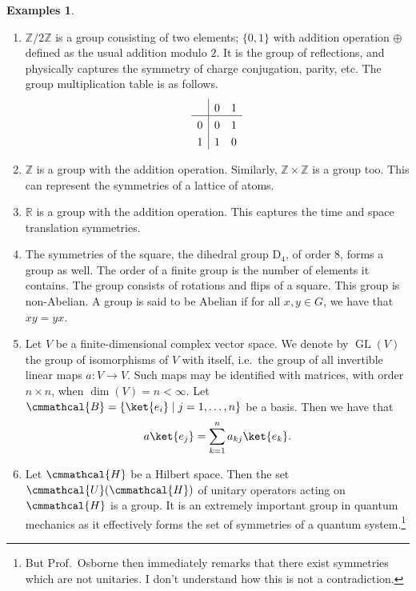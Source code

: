 \documentclass[a4 paper, 12pt]{book}
\renewcommand{\mathcal}{\cmmathcal}
\theoremstyle{definition}
\newtheorem{examples}[theorem]{Examples}
\newcommand{\rr}{\mathbb{R}}
\newcommand{\zz}{\mathbb{Z}}
\DeclareMathOperator{\GL}{GL}
\newcommand{\basis}{\mathcal{B}}
\newcommand{\hilbert}{\mathcal{H}}
\newcommand{\unitary}{\mathcal{U}}
\begin{document}
	\begin{examples}
		\leavevmode \vspace{-\baselineskip}\vspace{12pt}
		\begin{enumerate}[label={(\alph*)},ref={\alph*}]
			\item \(\zz / 2\zz\) is a group consisting of two elements; \(\{0, 1\}\) with addition operation \(\oplus\) defined as the usual addition modulo \(2\). It is the group of reflections, and physically captures the symmetry of charge conjugation, parity, etc.
			The group multiplication table is as follows.
			\begin{align*}
				\setlength{\extrarowheight}{3pt}%
				\begin{array}{l|*{5}{l}}
						& 0   & 1\\
					\hline
					0   & 0   & 1\\
					1   & 1   & 0\\
				\end{array}
			\end{align*}
			\item \(\zz\) is a group with the addition operation. Similarly, \(\zz \times \zz\) is a group too. This can represent the symmetries of a lattice of atoms.
			\item \(\rr\) is a group with the addition operation. This captures the time and space translation symmetries.
			\item The symmetries of the square, the dihedral group \(\mathrm{D}_4\), of order \(8\), forms a group as well. The order of a finite group is the number of elements it contains. The group consists of rotations and flips of a square. This group is non-Abelian. A group is said to be Abelian if for all \(x, y \in G\), we have that \(xy = yx\).
			\item Let \(V\) be a finite-dimensional complex vector space. We denote by \(\GL(V)\) the group of isomorphisms of \(V\) with itself, i.e.\ the group of all invertible linear maps \(a \colon V \rightarrow V\). Such maps may be identified with matrices, with order \(n \times n\), when \(\dim (V) = n < \infty\). Let \(\basis = \{\ket{e_i} \mid j = 1, \ldots, n\}\) be a basis. Then we have that
			\begin{align*}
				a\ket{e_j} = \sum_{k=1}^n a_{kj}\ket{e_k}.
			\end{align*}
			\item Let \(\hilbert\) be a Hilbert space. Then the set \(\unitary(\hilbert)\) of unitary operators acting on \(\hilbert\) is a group. It is an extremely important group in quantum mechanics as it effectively forms the set of symmetries of a quantum system.\footnote{But Prof.\ Osborne then immediately remarks that there exist symmetries which are not unitaries. I don't understand how this is not a contradiction.}
		\end{enumerate}
	\end{examples}
\end{document}
